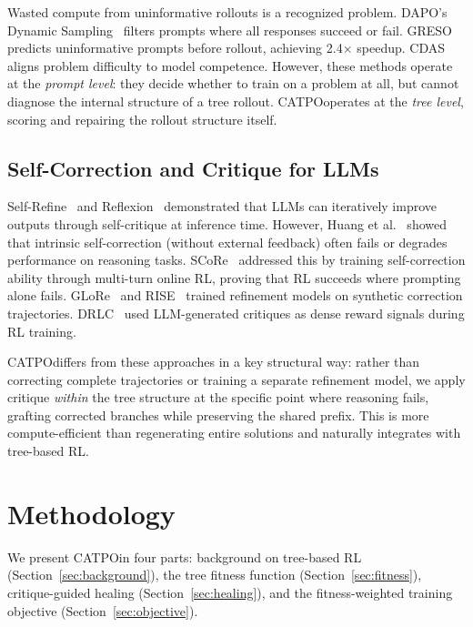 \documentclass{article} %
\newcommand{\CATPO}{\textsc{CATPO}}
\begin{document}
Wasted compute from uninformative rollouts is a recognized problem. DAPO's Dynamic Sampling~\citep{dapo} filters prompts where all responses succeed or fail. GRESO~\citep{greso} predicts uninformative prompts before rollout, achieving 2.4$\times$ speedup. CDAS~\citep{cdas} aligns problem difficulty to model competence. However, these methods operate at the \emph{prompt level}: they decide whether to train on a problem at all, but cannot diagnose the internal structure of a tree rollout. \CATPO operates at the \emph{tree level}, scoring and repairing the rollout structure itself.

\subsection{Self-Correction and Critique for LLMs}

Self-Refine~\citep{selfrefine} and Reflexion~\citep{reflexion} demonstrated that LLMs can iteratively improve outputs through self-critique at inference time. However, Huang et al.~\citep{huangselfcorrect} showed that intrinsic self-correction (without external feedback) often fails or degrades performance on reasoning tasks. SCoRe~\citep{score} addressed this by training self-correction ability through multi-turn online RL, proving that RL succeeds where prompting alone fails. GLoRe~\citep{glore} and RISE~\citep{rise} trained refinement models on synthetic correction trajectories. DRLC~\citep{drlc} used LLM-generated critiques as dense reward signals during RL training.

\CATPO differs from these approaches in a key structural way: rather than correcting complete trajectories or training a separate refinement model, we apply critique \emph{within} the tree structure at the specific point where reasoning fails, grafting corrected branches while preserving the shared prefix. This is more compute-efficient than regenerating entire solutions and naturally integrates with tree-based RL.


\section{Methodology}
\label{sec:method}

We present \CATPO in four parts: background on tree-based RL (Section~\ref{sec:background}), the tree fitness function (Section~\ref{sec:fitness}), critique-guided healing (Section~\ref{sec:healing}), and the fitness-weighted training objective (Section~\ref{sec:objective}).
\end{document}
